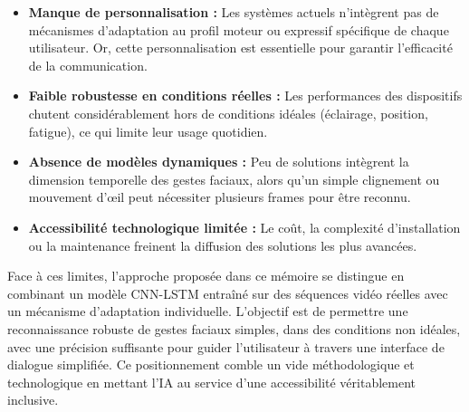 \documentclass[
]{article}
\begin{document}
\begin{itemize}
\item
  \textbf{Manque de personnalisation :} Les systèmes actuels n'intègrent pas de mécanismes d'adaptation au profil moteur ou expressif spécifique de chaque utilisateur. Or, cette personnalisation est essentielle pour garantir l'efficacité de la communication.
\item
  \textbf{Faible robustesse en conditions réelles :} Les performances des dispositifs chutent considérablement hors de conditions idéales (éclairage, position, fatigue), ce qui limite leur usage quotidien.
\item
  \textbf{Absence de modèles dynamiques :} Peu de solutions intègrent la dimension temporelle des gestes faciaux, alors qu'un simple clignement ou mouvement d'œil peut nécessiter plusieurs frames pour être reconnu.
\item
  \textbf{Accessibilité technologique limitée :} Le coût, la complexité d'installation ou la maintenance freinent la diffusion des solutions les plus avancées.
\end{itemize}

Face à ces limites, l'approche proposée dans ce mémoire se distingue en combinant un modèle CNN-LSTM entraîné sur des séquences vidéo réelles avec un mécanisme d'adaptation individuelle. L'objectif est de permettre une reconnaissance robuste de gestes faciaux simples, dans des conditions non idéales, avec une précision suffisante pour guider l'utilisateur à travers une interface de dialogue simplifiée. Ce positionnement comble un vide méthodologique et technologique en mettant l'IA au service d'une accessibilité véritablement inclusive.

\hypertarget{section-44}{%
\subsection{}\label{section-44}}

\hypertarget{section-45}{%
\subsection{}\label{section-45}}

\hypertarget{section-46}{%
\subsection{}\label{section-46}}

\hypertarget{section-47}{%
\subsection{}\label{section-47}}
\end{document}
